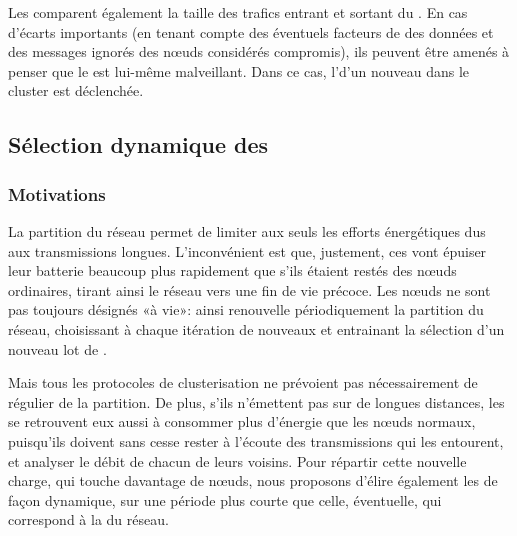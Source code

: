 Les \cns comparent également la taille des trafics entrant et sortant du \ch.
En cas d'écarts importants (en tenant compte des éventuels facteurs de  des données et des messages ignorés des nœuds considérés compromis), ils peuvent être amenés à penser que le \ch est lui-même malveillant.
Dans ce cas, l'\election d'un nouveau \CH dans le cluster est déclenchée.

    \subsection{Sélection dynamique des \cns}

        \subsubsection{Motivations}
La partition du réseau permet de limiter aux seuls \chs les efforts énergétiques dus aux transmissions longues.
L'inconvénient est que, justement, ces \CH vont épuiser leur batterie beaucoup plus rapidement que s'ils étaient restés des nœuds ordinaires, tirant ainsi le réseau vers une fin de vie précoce.
Les nœuds ne sont pas toujours désignés \CH «à vie»: ainsi \leach renouvelle périodiquement la partition du réseau, choisissant à chaque itération de nouveaux \chs et entrainant la sélection d'un nouveau lot de \cns.

Mais tous les protocoles de clusterisation ne prévoient pas nécessairement de  régulier de la partition.
De plus, s'ils n'émettent pas sur de longues distances, les \cns se retrouvent eux aussi à consommer plus d'énergie que les nœuds normaux, puisqu'ils doivent sans cesse rester à l'écoute des transmissions qui les entourent, et analyser le débit de chacun de leurs voisins.
Pour répartir cette nouvelle charge, qui touche davantage de nœuds, nous proposons d'élire également les \cns de façon dynamique, sur une période plus courte que celle, éventuelle, qui correspond à la  du réseau.

